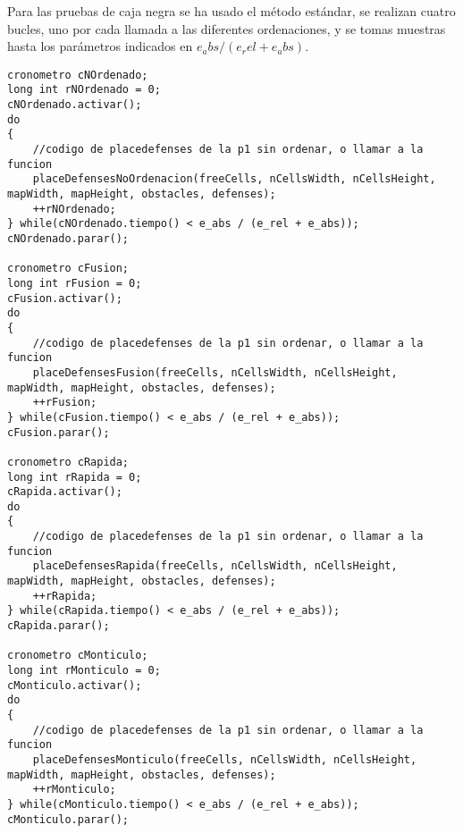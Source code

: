Para las pruebas de caja negra se ha usado el método estándar, se realizan cuatro bucles, uno por cada llamada a las diferentes ordenaciones, y se tomas muestras hasta los  parámetros indicados en $e_abs / (e_rel + e_abs)$.

\begin{lstlisting}
cronometro cNOrdenado;
long int rNOrdenado = 0;
cNOrdenado.activar();
do
{
	//codigo de placedefenses de la p1 sin ordenar, o llamar a la funcion
	placeDefensesNoOrdenacion(freeCells, nCellsWidth, nCellsHeight, mapWidth, mapHeight, obstacles, defenses);
	++rNOrdenado;
} while(cNOrdenado.tiempo() < e_abs / (e_rel + e_abs));
cNOrdenado.parar();

cronometro cFusion;
long int rFusion = 0;
cFusion.activar();
do
{
	//codigo de placedefenses de la p1 sin ordenar, o llamar a la funcion
	placeDefensesFusion(freeCells, nCellsWidth, nCellsHeight, mapWidth, mapHeight, obstacles, defenses);
	++rFusion;
} while(cFusion.tiempo() < e_abs / (e_rel + e_abs));
cFusion.parar();

cronometro cRapida;
long int rRapida = 0;
cRapida.activar();
do
{
	//codigo de placedefenses de la p1 sin ordenar, o llamar a la funcion
	placeDefensesRapida(freeCells, nCellsWidth, nCellsHeight, mapWidth, mapHeight, obstacles, defenses);
	++rRapida;
} while(cRapida.tiempo() < e_abs / (e_rel + e_abs));
cRapida.parar();

cronometro cMonticulo;
long int rMonticulo = 0;
cMonticulo.activar();
do
{
	//codigo de placedefenses de la p1 sin ordenar, o llamar a la funcion
	placeDefensesMonticulo(freeCells, nCellsWidth, nCellsHeight, mapWidth, mapHeight, obstacles, defenses);
	++rMonticulo;
} while(cMonticulo.tiempo() < e_abs / (e_rel + e_abs));
cMonticulo.parar();
\end{lstlisting}